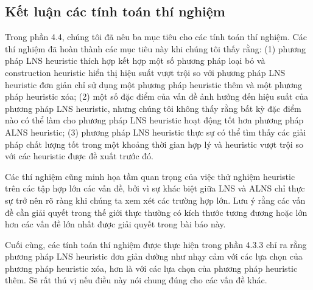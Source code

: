\subsection{Kết luận các tính toán thí nghiệm}
Trong phần 4.4, chúng tôi đã nêu ba mục tiêu cho các tính toán thí nghiệm. Các thí nghiệm đã hoàn thành các mục tiêu này khi chúng tôi thấy rằng: (1) phương pháp LNS heuristic thích hợp kết hợp một số phương pháp loại bỏ và construction heuristic hiển thị hiệu suất vượt trội so với phương pháp LNS heuristic đơn giản chỉ sử dụng một phương pháp heuristic thêm và một phương pháp heuristic xóa; (2) một số đặc điểm của vấn đề ảnh hưởng đến hiệu suất của phương pháp LNS heuristic, nhưng chúng tôi không thấy rằng bất kỳ đặc điểm nào có thể làm cho phương pháp LNS heuristic hoạt động tốt hơn phương pháp ALNS heuristic; (3) phương pháp LNS heuristic thực sự có thể tìm thấy các giải pháp chất lượng tốt trong một khoảng thời gian hợp lý và heuristic vượt trội so với các heuristic được đề xuất trước đó.

Các thí nghiệm cũng minh họa tầm quan trọng của việc thử nghiệm heuristic trên các tập hợp lớn các vấn đề, bởi vì sự khác biệt giữa LNS và ALNS chỉ thực sự trở nên rõ ràng khi chúng ta xem xét các trường hợp lớn. Lưu ý rằng các vấn đề cần giải quyết trong thế giới thực thường có kích thước tương đương hoặc lớn hơn các vấn đề lớn nhất được giải quyết trong bài báo này.

Cuối cùng, các tính toán thí nghiệm được thực hiện trong phần 4.3.3 chỉ ra rằng phương pháp LNS heuristic đơn giản dường như nhạy cảm với các lựa chọn của phương pháp heuristic xóa, hơn là với các lựa chọn của phương pháp heuristic thêm. Sẽ rất thú vị nếu điều này nói chung đúng cho các vấn đề khác.
